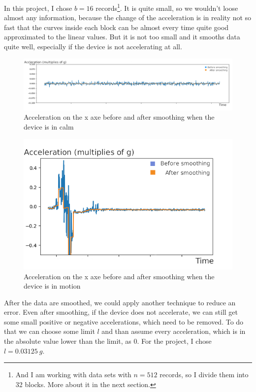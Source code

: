 \documentclass[hidelinks,a4paper]{article}
\begin{document}
In this project, I chose $b = 16$ records\footnote{And I am working with data sets with $n=512$ records, so I divide them into 32 blocks. More about it in the next section.}. It is quite small, so we wouldn't loose almost any information, because the change of the acceleration is in reality not so fast that the curves inside each block can be almost every time quite good approximated to the linear values. But it is not too small and it smooths data quite well, especially if the device is not accelerating at all.\par
\begin{figure}[h]
    \includegraphics[width=15cm]{img/calmSmoothing.png}
    \caption{Acceleration on the x axe before and after smoothing when the device is in calm}
\end{figure}
\begin{figure}[h]
    \includegraphics[width=15cm]{img/motionSmoothing.png}
    \caption{Acceleration on the x axe before and after smoothing when the device is in motion}
\end{figure}
After the data are smoothed, we could apply another technique to reduce an error. Even after smoothing, if the device does not accelerate, we can still get some small positive or negative accelerations, which need to be removed. To do that we can choose some limit $l$ and than assume every acceleration, which is in the absolute value lower than the limit, as 0. For the project, I chose $l = 0.03125~g$.
\end{document}
